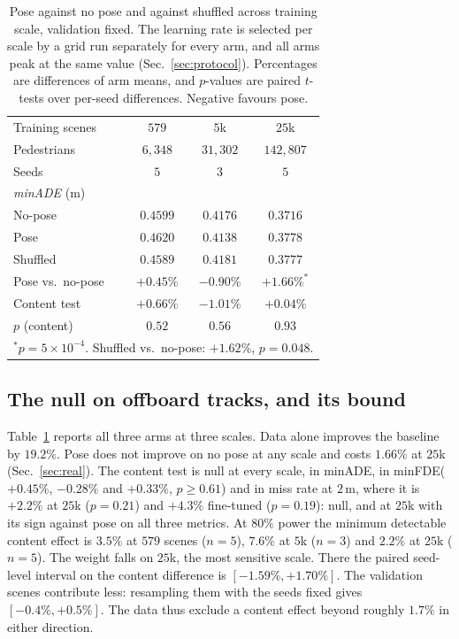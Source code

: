 \documentclass[conference]{IEEEtran}
\newcommand{\minADE}{minADE\xspace}
\newcommand{\minFDE}{minFDE\xspace}
\begin{document}
\begin{table}[t]
\caption{Pose against no pose and against shuffled across training scale, validation fixed. The learning rate
is selected per scale by a grid run separately for every arm, and all arms peak at the
same value (Sec.~\ref{sec:protocol}). Percentages are differences of arm means, and
$p$-values are paired $t$-tests over per-seed differences. Negative favours pose.}
\label{tab:ladder}
\centering
\footnotesize
\begin{tabular}{lccc}
\toprule
Training scenes & $579$ & $5$k & $25$k \\
Pedestrians & $6{,}348$ & $31{,}302$ & $142{,}807$ \\
Seeds & $5$ & $3$ & $5$ \\
\midrule
\multicolumn{4}{l}{\emph{\minADE} (m)} \\
No-pose  & $0.4599$ & $0.4176$ & $0.3716$ \\
Pose     & $0.4620$ & $0.4138$ & $0.3778$ \\
Shuffled & $0.4589$ & $0.4181$ & $0.3777$ \\
Pose vs.\ no-pose & $+0.45\%$ & $-0.90\%$ & $+1.66\%^{*}$ \\
Content test & $+0.66\%$ & $-1.01\%$ & $+0.04\%$ \\
$p$ (content) & $0.52$ & $0.56$ & $0.93$ \\
\bottomrule
\multicolumn{4}{l}{\footnotesize $^{*}p{=}5{\times}10^{-4}$. Shuffled vs.\ no-pose: $+1.62\%$, $p{=}0.048$.}
\end{tabular}
\end{table}


\subsection{The null on offboard tracks, and its bound}
Table~\ref{tab:ladder} reports all three arms at three scales. Data alone improves
the baseline by $19.2\%$. Pose does not improve on no pose at any scale and
costs $1.66\%$ at $25$k (Sec.~\ref{sec:real}). The content test is null at every scale, in
\minADE, in \minFDE ($+0.45\%$, $-0.28\%$ and $+0.33\%$, $p\ge0.61$) and in miss
rate at $2$\,m, where it is
$+2.2\%$ at $25$k ($p{=}0.21$) and $+4.3\%$ fine-tuned ($p{=}0.19$): null, and
at $25$k with its sign against pose on all three metrics. At $80\%$ power the minimum
detectable content effect is
$3.5\%$ at $579$ scenes ($n{=}5$), $7.6\%$ at $5$k ($n{=}3$) and $2.2\%$ at
$25$k ($n{=}5$). The weight
falls on $25$k, the most sensitive scale. There the paired
seed-level interval on the content difference is $[-1.59\%,+1.70\%]$. The
validation scenes contribute less: resampling them with the seeds fixed gives
$[-0.4\%,+0.5\%]$. The
data thus exclude a content effect beyond roughly $1.7\%$ in either direction.
\end{document}
